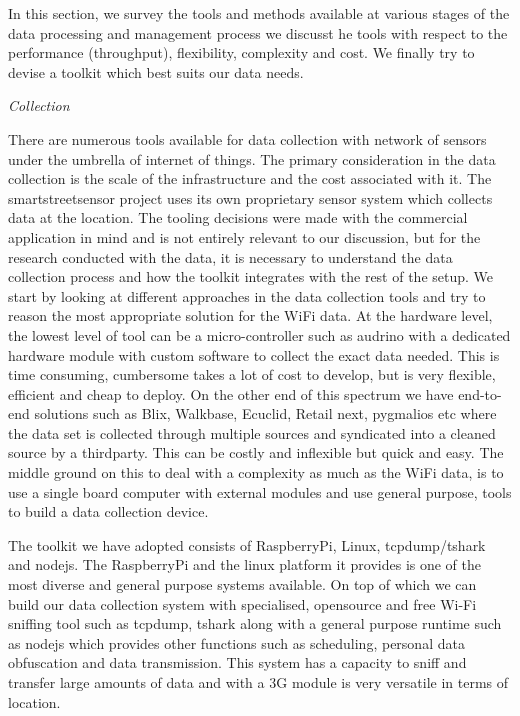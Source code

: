 In this section, we survey the tools and methods available at various stages of the data processing and management process we discusst he tools with respect to the performance (throughput), flexibility, complexity and cost.
We finally try to devise a toolkit which best suits our data needs.


\textit{Collection}

There are numerous tools available for data collection with network of sensors under the umbrella of internet of things.
The primary consideration in the data collection is the scale of the infrastructure and the cost associated with it.
The smartstreetsensor project uses its own proprietary sensor system which collects data at the location.
The tooling decisions were made with the commercial application in mind and is not entirely relevant to our discussion, but for the research conducted with the data, it is necessary to understand the data collection process and how the toolkit integrates with the rest of the setup.
We start by looking at different approaches in the data collection tools and try to reason the most appropriate solution for the WiFi data.
At the hardware level, the lowest level of tool can be a micro-controller such as audrino with a dedicated hardware module with custom software to collect the exact data needed.
This is time consuming, cumbersome takes a lot of cost to develop, but is very flexible, efficient and cheap to deploy.
On the other end of this spectrum we have end-to-end solutions such as Blix, Walkbase, Ecuclid, Retail next, pygmalios etc where the data set is collected through multiple sources and syndicated into a cleaned source by a thirdparty.
This can be costly and inflexible but quick and easy.
The middle ground on this to deal with a complexity as much as the WiFi data, is to use a single board computer with external modules and use general purpose, tools to build a data collection device.

The toolkit we have adopted consists of RaspberryPi, Linux, tcpdump/tshark and nodejs.
The RaspberryPi and the linux platform it provides is one of the most diverse and general purpose systems available.
On top of which we can build our data collection system with specialised, opensource and free Wi-Fi sniffing tool such as tcpdump, tshark along with a general purpose runtime such as nodejs which provides other functions such as scheduling, personal data obfuscation and data transmission.
This system has a capacity to sniff and transfer large amounts of data and with a 3G module is very versatile in terms of location.

